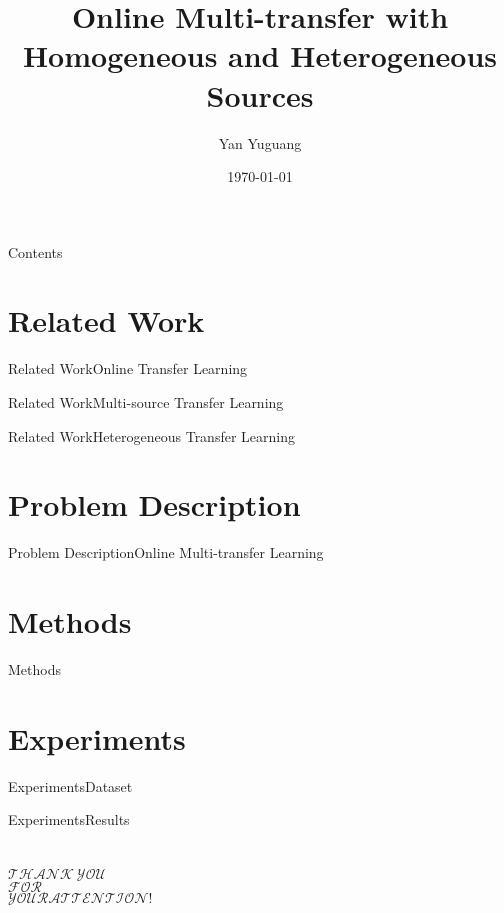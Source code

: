 \documentclass{beamer}
\begin{document}
\title[OMT]{Online Multi-transfer with Homogeneous and Heterogeneous Sources}
\author[yanyg]{Yan Yuguang}
\date{\today}
\subject{Online Multi-transfer}


\maketitle

\begin{frame}{Contents}
  \tableofcontents[hideallsubsections]
\end{frame}

\section{Related Work}
\begin{frame}{Related Work}{Online Transfer Learning}
\end{frame}

\begin{frame}{Related Work}{Multi-source Transfer Learning}
\end{frame}

\begin{frame}{Related Work}{Heterogeneous Transfer Learning}
\end{frame}

\section{Problem Description}
\begin{frame}{Problem Description}{Online Multi-transfer Learning}
\end{frame}

\section{Methods}
\begin{frame}{Methods}{}
\end{frame}

\section{Experiments}
\begin{frame}{Experiments}{Dataset}
\end{frame}

\begin{frame}{Experiments}{Results}
\end{frame}

\section{}
\begin{frame}{}{}
\begin{center}
\begin{Huge}
$ \mathcal{THANK \ YOU}$ \\
$ \mathcal{FOR} $ \\
$ \mathcal{YOUR ATTENTION!}$ \\
\end{Huge}
\end{center}
\end{frame}
\end{document}
